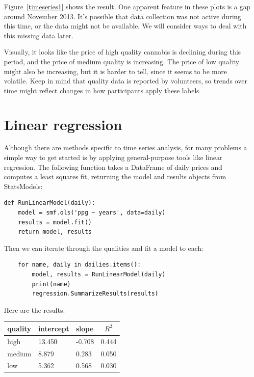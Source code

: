 \documentclass[12pt]{book}
\theoremstyle{exercise}
\begin{document}
Figure~\ref{timeseries1} shows the result.  One apparent feature in
these plots is a gap around November 2013.  It's possible that data
collection was not active during this time, or the data might not
be available.  We will consider ways to deal with this missing data
later.%

Visually, it looks like the price of high quality cannabis is
declining during this period, and the price of medium quality is
increasing.  The price of low quality might also be increasing, but it
is harder to tell, since it seems to be more volatile.  Keep in mind
that quality data is reported by volunteers, so trends over time
might reflect changes in how participants apply these labels.%


\section{Linear regression}%
\label{timeregress}

Although there are methods specific to time series analysis, for many
problems a simple way to get started is by applying general-purpose
tools like linear regression.  The following function takes a
DataFrame of daily prices and computes a least squares fit, returning
the model and results objects from StatsModels:%
%
%

\begin{verbatim}
def RunLinearModel(daily):
    model = smf.ols('ppg ~ years', data=daily)
    results = model.fit()
    return model, results
\end{verbatim}

Then we can iterate through the qualities and fit a model to
each:

\begin{verbatim}
    for name, daily in dailies.items():
        model, results = RunLinearModel(daily)
        print(name)
        regression.SummarizeResults(results)
\end{verbatim}

Here are the results:

\begin{center}
\begin{tabular}{|l|l|l|c|} \hline
quality & intercept & slope & $R^2$ \\ \hline
high    & 13.450  & -0.708  & 0.444 \\
medium  &  8.879  & 0.283   & 0.050 \\
low     &  5.362  & 0.568   & 0.030 \\
\hline
\end{tabular}
\end{center}
\end{document}
